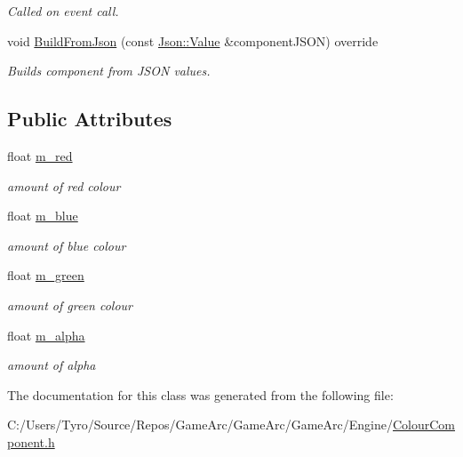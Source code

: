 \begin{DoxyCompactItemize}
\begin{DoxyCompactList}\small\item\em Called on event call. \end{DoxyCompactList}\item 
\mbox{\label{class_colour_component_aed1ca4037054bfa011639dd3fcebeb34}} 
void \mbox{\hyperlink{class_colour_component_aed1ca4037054bfa011639dd3fcebeb34}{Build\+From\+Json}} (const \mbox{\hyperlink{class_json_1_1_value}{Json\+::\+Value}} \&component\+J\+S\+ON) override
\begin{DoxyCompactList}\small\item\em Builds component from J\+S\+ON values. \end{DoxyCompactList}\end{DoxyCompactItemize}
\subsection*{Public Attributes}
\begin{DoxyCompactItemize}
\item 
\mbox{\label{class_colour_component_a8ade0f6438bffa3f1e6c895435ffa154}} 
float \mbox{\hyperlink{class_colour_component_a8ade0f6438bffa3f1e6c895435ffa154}{m\+\_\+red}}
\begin{DoxyCompactList}\small\item\em amount of red colour \end{DoxyCompactList}\item 
\mbox{\label{class_colour_component_a8da5ecb3619ae04479119083e1086bd3}} 
float \mbox{\hyperlink{class_colour_component_a8da5ecb3619ae04479119083e1086bd3}{m\+\_\+blue}}
\begin{DoxyCompactList}\small\item\em amount of blue colour \end{DoxyCompactList}\item 
\mbox{\label{class_colour_component_a679613f98b6d1677900aa3341016e7b5}} 
float \mbox{\hyperlink{class_colour_component_a679613f98b6d1677900aa3341016e7b5}{m\+\_\+green}}
\begin{DoxyCompactList}\small\item\em amount of green colour \end{DoxyCompactList}\item 
\mbox{\label{class_colour_component_ae7f936cbf7c3c510d6a7aa83a6290190}} 
float \mbox{\hyperlink{class_colour_component_ae7f936cbf7c3c510d6a7aa83a6290190}{m\+\_\+alpha}}
\begin{DoxyCompactList}\small\item\em amount of alpha \end{DoxyCompactList}\end{DoxyCompactItemize}


The documentation for this class was generated from the following file\+:\begin{DoxyCompactItemize}
\item 
C\+:/\+Users/\+Tyro/\+Source/\+Repos/\+Game\+Arc/\+Game\+Arc/\+Game\+Arc/\+Engine/\mbox{\hyperlink{_colour_component_8h}{Colour\+Component.\+h}}\end{DoxyCompactItemize}
